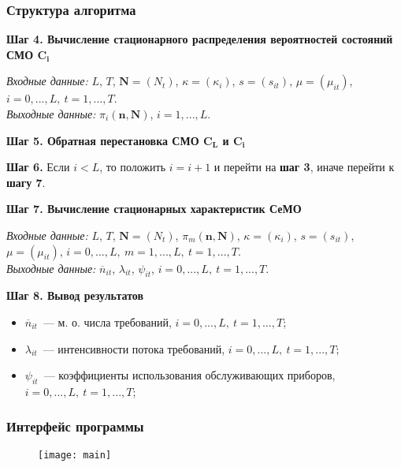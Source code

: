 
\begin{frame} \frametitle{Структура алгоритма}

\textbf{Шаг 4. Вычисление стационарного распределения вероятностей состояний СМО $\boldsymbol{C_i}$}

\emph{Входные данные:} $L$, $T$, $\mathbf{N}=(N_t)$, $\kappa=(\kappa_i)$, $s=(s_{it})$, $\mu=(\mu_{it})$, $i=0,...,L,~t=1,...,T$.\\
\emph{Выходные данные:} $\pi_i(\mathbf{n},\mathbf{N})$, $i=1,...,L$.

\textbf{Шаг 5. Обратная перестановка СМО $\boldsymbol{C_L}$ и $\boldsymbol{C_i}$}

\textbf{Шаг 6.} Если $i < L$, то положить $i=i+1$ и перейти на \textbf{шаг 3}, иначе перейти к \textbf{шагу 7}.

\textbf{Шаг 7. Вычисление стационарных характеристик СеМО}

\emph{Входные данные:} $L$, $T$, $\mathbf{N}=(N_t)$, $\pi_m(\mathbf{n},\mathbf{N})$, $\kappa=(\kappa_i)$, $s=(s_{it})$, $\mu=(\mu_{it})$, $i=0,...,L,~m=1,...,L,~t=1,...,T$.\\
\emph{Выходные данные:} $\overline{n}_{it}$, $\lambda_{it}$, $\psi_{it}$, $i=0,...,L,~t=1,...,T$.

\textbf{Шаг 8. Вывод результатов}

\begin{itemize}
\item $\overline{n}_{it}$~--- м. о. числа требований, $i=0,...,L,~t=1,...,T$;
\item $\lambda_{it}$~--- интенсивности потока требований, $i=0,...,L,~t=1,...,T$;
\item $\psi_{it}$~--- коэффициенты использования обслуживающих приборов, $i=0,...,L,~t=1,...,T$;
\end{itemize}
\end{frame}


\begin{frame} \frametitle{Интерфейс программы}
\begin{figure}[H]
  \centering
  \texttt{[image: main]}
  \label{fig:main}
\end{figure}
\end{frame}


